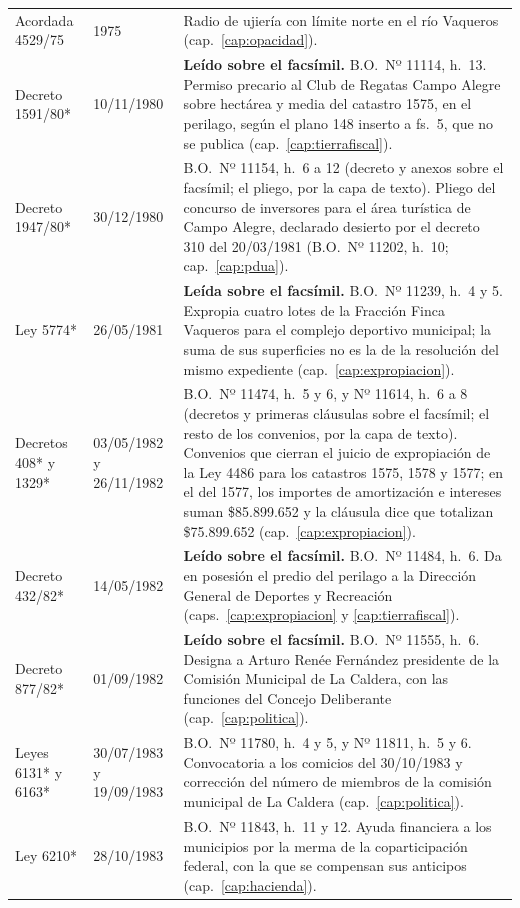 \begin{longtable}{@{}p{3.2cm}p{1.9cm}p{7.9cm}@{}}
Acordada 4529/75 & 1975 & Radio de ujiería con límite norte en el río Vaqueros (cap.\ \ref{cap:opacidad}). \\
Decreto 1591/80* & 10/11/1980 & \textbf{Leído sobre el facsímil.} B.O.\ Nº 11114, h.\ 13. Permiso precario al Club de Regatas Campo Alegre sobre hectárea y media del catastro 1575, en el perilago, según el plano 148 inserto a fs.\ 5, que no se publica (cap.\ \ref{cap:tierrafiscal}). \\
Decreto 1947/80* & 30/12/1980 & B.O.\ Nº 11154, h.\ 6 a 12 (decreto y anexos sobre el facsímil; el pliego, por la capa de texto). Pliego del concurso de inversores para el área turística de Campo Alegre, declarado desierto por el decreto 310 del 20/03/1981 (B.O.\ Nº 11202, h.\ 10; cap.\ \ref{cap:pdua}). \\
Ley 5774* & 26/05/1981 & \textbf{Leída sobre el facsímil.} B.O.\ Nº 11239, h.\ 4 y 5. Expropia cuatro lotes de la Fracción Finca Vaqueros para el complejo deportivo municipal; la suma de sus superficies no es la de la resolución del mismo expediente (cap.\ \ref{cap:expropiacion}). \\
Decretos 408* y 1329* & 03/05/1982 y 26/11/1982 & B.O.\ Nº 11474, h.\ 5 y 6, y Nº 11614, h.\ 6 a 8 (decretos y primeras cláusulas sobre el facsímil; el resto de los convenios, por la capa de texto). Convenios que cierran el juicio de expropiación de la Ley 4486 para los catastros 1575, 1578 y 1577; en el del 1577, los importes de amortización e intereses suman \$85.899.652 y la cláusula dice que totalizan \$75.899.652 (cap.\ \ref{cap:expropiacion}). \\
Decreto 432/82* & 14/05/1982 & \textbf{Leído sobre el facsímil.} B.O.\ Nº 11484, h.\ 6. Da en posesión el predio del perilago a la Dirección General de Deportes y Recreación (caps.\ \ref{cap:expropiacion} y \ref{cap:tierrafiscal}). \\
Decreto 877/82* & 01/09/1982 & \textbf{Leído sobre el facsímil.} B.O.\ Nº 11555, h.\ 6. Designa a Arturo Renée Fernández presidente de la Comisión Municipal de La Caldera, con las funciones del Concejo Deliberante (cap.\ \ref{cap:politica}). \\
Leyes 6131* y 6163* & 30/07/1983 y 19/09/1983 & B.O.\ Nº 11780, h.\ 4 y 5, y Nº 11811, h.\ 5 y 6. Convocatoria a los comicios del 30/10/1983 y corrección del número de miembros de la comisión municipal de La Caldera (cap.\ \ref{cap:politica}). \\
Ley 6210* & 28/10/1983 & B.O.\ Nº 11843, h.\ 11 y 12. Ayuda financiera a los municipios por la merma de la coparticipación federal, con la que se compensan sus anticipos (cap.\ \ref{cap:hacienda}). \\

\end{longtable}
